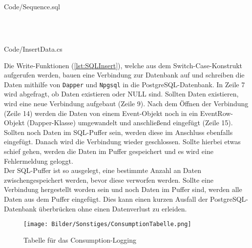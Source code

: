 \ \\
\begin{minipage}{\textwidth}
\ \\
 {Code/Sequence.sql}
\ \\
\end{minipage}
\ \\
\begin{minipage}{\textwidth}
\ \\
 {Code/InsertData.cs}
\ \\
\end{minipage}
Die Write-Funktionen (\autoref{lst:SQLInsert}), welche aus dem Switch-Case-Konstrukt aufgerufen werden, bauen eine Verbindung zur Datenbank auf und schreiben die Daten mithilfe von \texttt{Dapper} und \texttt{Npgsql} in die PostgreSQL-Datenbank.  In Zeile 7 wird abgefragt, ob Daten existieren oder NULL sind. Sollten Daten existieren, wird eine neue Verbindung aufgebaut (Zeile 9). Nach dem Öffnen der Verbindung (Zeile 14) werden die Daten von einem Event-Objekt noch in ein EventRow-Objekt (Dapper-Klasse) umgewandelt und anschließend eingefügt (Zeile 15). Sollten noch Daten im SQL-Puffer sein, werden diese im Anschluss ebenfalls eingefügt. Danach wird die Verbindung wieder geschlossen. Sollte hierbei etwas schief gehen, werden die Daten im Puffer gespeichert und es wird eine Fehlermeldung geloggt. 
\ \\
Der SQL-Puffer ist so ausgelegt, eine bestimmte Anzahl an Daten zwischengespeichert werden, bevor diese verworfen werden. Sollte eine Verbindung hergestellt worden sein und noch Daten im Puffer sind, werden alle Daten aus dem Puffer eingefügt. Dies kann einen kurzen Ausfall der PostgreSQL-Datenbank überbrücken ohne einen Datenverlust zu erleiden.


\begin{figure}
\centering
 \texttt{[image: Bilder/Sonstiges/ConsumptionTabelle.png]}
 \caption[Tabelle für das Consumption-Logging]{Tabelle für das Consumption-Logging}
 \label{fig:ConsumptionTabelle}
\end{figure}
